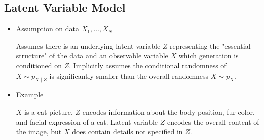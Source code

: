 \documentclass{beamer}
\begin{document}
\subsection{Latent Variable Model}


\begin{frame}[allowframebreaks]

\begin{itemize}
    \item
    Assumption on data $X_{1}, \ldots, X_{N}$

    Assumes there is an underlying latent variable $Z$ representing the "essential structure" of the data and an observable variable $X$ which generation is conditioned on $Z$. Implicitly assumes the conditional randomness of $X \sim p_{X \mid Z}$ is significantly smaller than the overall randomness $X \sim p_{X}$.
    \item
    Example

    $X$ is a cat picture. $Z$ encodes information about the body position, fur color, and facial expression of a cat. Latent variable $Z$ encodes the overall content of the image, but $X$ does contain details not specified in $Z$.
\end{itemize}

\end{frame}
\end{document}
